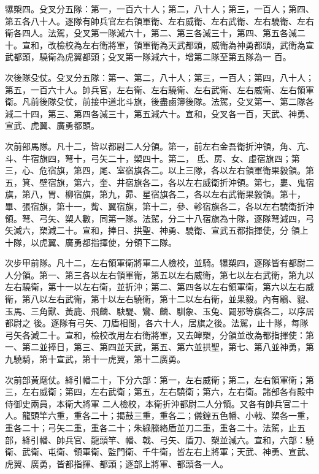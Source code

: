 \begin{pinyinscope}
 犦槊四。殳叉分五隊：第一，一百六十人；第二，八十人；第三，一百人；第四、第五各八十人。逐隊有帥兵官左右領軍衛、左右威衛、左右武衛、左右驍衛、左右衛各四人。法駕，殳叉第一隊減六十，第二、第三各減三十，第四、第五各減二十。宣和，改檢校為左右衛將軍，領軍衛為天武都頭，威衛為神勇都頭，武衛為宣武都頭，驍衛為虎翼都頭；殳叉第一隊減六十，增第二隊至第五隊為一
 百。



 次後隊殳仗。殳叉分五隊：第一、第二，八十人；第三，一百人；第四，八十人；第五，一百六十人。帥兵官，左右衛、左右驍衛、左右武衛、左右威衛、左右領軍衛。凡前後隊殳仗，前接中道北斗旗，後盡鹵簿後隊。法駕，殳叉第一、第二隊各減二十四，第三、第四各減三十，第五減六十。宣和，殳叉各一百，天武、神勇、宣武、虎翼、廣勇都頭。



 次前部馬隊。凡十二，皆以都尉二人分領。第一，前左右金吾衛折沖領，角、亢、斗、牛宿旗四，弩十，弓矢二十，槊四十。第二，
 氐、房、女、虛宿旗四；第三，心、危宿旗，第四，尾、室宿旗各二。以上三隊，各以左右領軍衛果毅領。第五，箕、壁宿旗，第六，奎、井宿旗各二，各以左右威衛折沖領。第七，婁、鬼宿旗，第八，胃、柳宿旗，第九，昴、星宿旗各二，各以左右武衛果毅領。第十，畢、張宿旗，第十一，觜、翼宿旗，第十二，參、軫宿旗各二，各以左右驍衛折沖領。弩、弓矢、槊人數，同第一隊。法駕，分二十八宿旗為十隊，逐隊弩減四，弓矢減六，槊減二十。宣和，捧日、拱聖、神勇、驍衛、宣武五都指揮使，分
 領上十隊，以虎翼、廣勇都指揮使，分領下二隊。



 次步甲前隊。凡十二，左右領軍衛將軍二人檢校，並騎。犦槊四，逐隊皆有都尉二人分領。第一、第三各以左右領軍衛，第五以左右威衛，第七以左右武衛，第九以左右驍衛，第十一以左右衛，並折沖；第二、第四各以左右領軍衛，第六以左右威衛，第八以左右武衛，第十以左右驍衛，第十二以左右衛，並果毅。內有鶡、貔、玉馬、三角獸、黃鹿、飛麟、駃騠、鸞、麟、馴象、玉兔、闢邪等旗各二，以序居都尉之
 後。逐隊有弓矢、刀盾相間，各六十人，居旗之後。法駕，止十隊，每隊弓矢各減二十。宣和，檢校改用左右衛將軍，又去皞槊，分領並改為都指揮使：第一、第二並捧日，第三、第四並天武，第五、第六並拱聖，第七、第八並神勇，第九驍騎，第十宣武，第十一虎翼，第十二廣勇。



 次前部黃麾仗。絳引幡二十，下分六部：第一，左右威衛；第二，左右領軍衛；第三，左右威衛；第四，左右武衛；第五，左右驍衛；第六，左右衛。諸部各有殿中侍御史兩員，本衛大將軍
 二人檢校，本衛折沖都尉二人分領。又各有帥兵官二十人。龍頭竿六重，重各二十；揭鼓三重，重各二；儀鍠五色幡、小戟、槊各一重，重各二十；弓矢二重，重各二十；朱綠縢絡盾並刀二重，重各二十。法駕，止五部，絳引幡、帥兵官、龍頭竿、幡、戟、弓矢、盾刀、槊並減六。宣和，六部：驍衛、武衛、屯衛、領軍衛、監門衛、千牛衛，皆左右上將軍；天武、神勇、宣武、虎翼、廣勇，皆都指揮、都頭；逐部上將軍、都頭各一人。




\end{pinyinscope}
